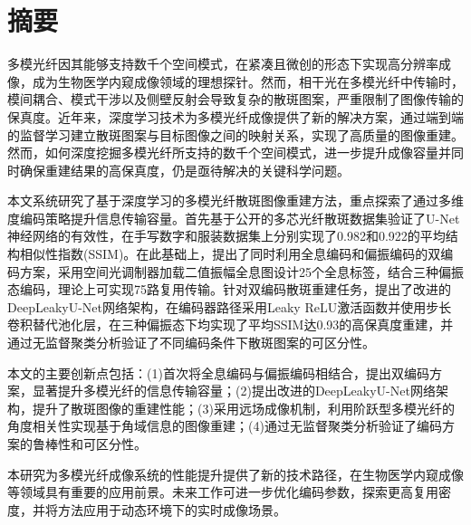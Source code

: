 

\maketitle%
\MAKETITLE%
\makedeclaration%
\intobmk\chapter*{摘\quad 要}%
\setcounter{page}{1}%

多模光纤因其能够支持数千个空间模式，在紧凑且微创的形态下实现高分辨率成像，成为生物医学内窥成像领域的理想探针。然而，相干光在多模光纤中传输时，模间耦合、模式干涉以及侧壁反射会导致复杂的散斑图案，严重限制了图像传输的保真度。近年来，深度学习技术为多模光纤成像提供了新的解决方案，通过端到端的监督学习建立散斑图案与目标图像之间的映射关系，实现了高质量的图像重建。然而，如何深度挖掘多模光纤所支持的数千个空间模式，进一步提升成像容量并同时确保重建结果的高保真度，仍是亟待解决的关键科学问题。

本文系统研究了基于深度学习的多模光纤散斑图像重建方法，重点探索了通过多维度编码策略提升信息传输容量。首先基于公开的多芯光纤散斑数据集验证了U-Net神经网络的有效性，在手写数字和服装数据集上分别实现了0.982和0.922的平均结构相似性指数(SSIM)。在此基础上，提出了同时利用全息编码和偏振编码的双编码方案，采用空间光调制器加载二值振幅全息图设计25个全息标签，结合三种偏振态编码，理论上可实现75路复用传输。针对双编码散斑重建任务，提出了改进的DeepLeakyU-Net网络架构，在编码器路径采用Leaky ReLU激活函数并使用步长卷积替代池化层，在三种偏振态下均实现了平均SSIM达0.93的高保真度重建，并通过无监督聚类分析验证了不同编码条件下散斑图案的可区分性。

本文的主要创新点包括：(1)首次将全息编码与偏振编码相结合，提出双编码方案，显著提升多模光纤的信息传输容量；(2)提出改进的DeepLeakyU-Net网络架构，提升了散斑图像的重建性能；(3)采用远场成像机制，利用阶跃型多模光纤的角度相关性实现基于角域信息的图像重建；(4)通过无监督聚类分析验证了编码方案的鲁棒性和可区分性。

本研究为多模光纤成像系统的性能提升提供了新的技术路径，在生物医学内窥成像等领域具有重要的应用前景。未来工作可进一步优化编码参数，探索更高复用密度，并将方法应用于动态环境下的实时成像场景。

